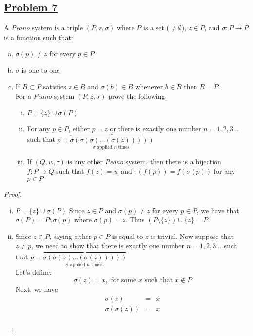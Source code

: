\documentclass[10pt,letterpaper]{article}
\begin{document}
	\subsection*{{\color{purple}\underline{Problem 7}}}
	A \emph{Peano} system is a triple $(P, z, \sigma)$ where $P$ is a set ($\neq \emptyset$), $z \in P$, and 
	$\sigma: P \rightarrow P$ is a function such that:
	\begin{enumerate}[(a)]
		\item $\sigma(p) \neq z$ for every $p \in P$ 
		\item $\sigma$ is one to one
		\item {\color{red}If $B \subset P$ satisfies $z \in B$ and $\sigma(b) \in B$ whenever $b \in B$ then $B = P$.} \\
		For a \emph{Peano} system $(P, z, \sigma)$ prove the following:
		\begin{enumerate}[(i)]
			\item $P = \{z\} \cup \sigma(P)$ 
			\item For any $p \in P$, either $p = z$ or there is exactly one number $n = 1, 2, 3 \ldots$ such that
			$p = \overbrace{\sigma(\sigma(\sigma(\ldots(\sigma(z)))))}_{\sigma \text{ applied } n \text{ times }}$
			\item If $(Q, w, \tau)$ is any other \emph{Peano} system, then there is a bijection $f: P \rightarrow Q$
			such that $f(z) = w$ and $\tau(f(p)) = f(\sigma(p))$ for any $p \in P$
		\end{enumerate}
	\end{enumerate}
\begin{proof}
	\text{ }
	\begin{enumerate}[(i)]
		\item $P = \{z\} \cup \sigma(P)$
		Since $z \in P$ and $\sigma(p) \neq z$ for every $p \in P$, 
		we have that $\sigma(P) = P \setminus \sigma(p)$ where $\sigma(p) = z$. Thus
		$(P \setminus \{z\}) \cup \{z\} = P$ 
		\item Since $z \in P$, saying either $p \in P$ is equal to $z$ is trivial. Now suppose that
		$z \neq p$, we need to show that  there is exactly one number $n = 1, 2, 3 \ldots$ such that
			$p = \overbrace{\sigma(\sigma(\sigma(\ldots(\sigma(z)))))}_{\sigma \text{ applied } n \text{ times }}$ \\
		Let's define:
			$$\sigma(z) = x, \text{ for some } x \text{ such that } x \not\in P$$
		Next, we have
		\begin{eqnarray*}
		\sigma(z) & = & x \\
		\sigma(\sigma(z)) & = & x \\
		\end{eqnarray*}
	\end{enumerate}
\end{proof}	
	
	
	
	
	
\end{document}

